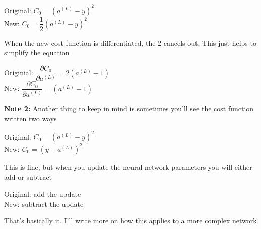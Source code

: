 \documentclass[11pt]{article}
\begin{document}
Original: \(C_0 = (a^{(L)} - y)^{2}\)\\
New: \(C_0 = \dfrac{1}{2}(a^{(L)} - y)^{2}\)

When the new cost function is differentiated, the 2 cancels out. This
just helps to simplify the equation

Originial: \(\dfrac{\partial C_0}{\partial a^{(L)}} = 2(a^{(L)} - 1)\)\\
New: \(\dfrac{\partial C_0}{\partial a^{(L)}} = (a^{(L)} - 1)\)

\textbf{Note 2:} Another thing to keep in mind is sometimes you'll see
the cost function written two ways

Original: \(C_0 = (a^{(L)} - y)^{2}\)\\
New: \(C_0 = (y - a^{(L)})^{2}\)

This is fine, but when you update the neural network parameters you will
either add or subtract

Original: add the update\\
New: subtract the update

That's basically it. I'll write more on how this applies to a more
complex network


    
    
    
    
\end{document}
